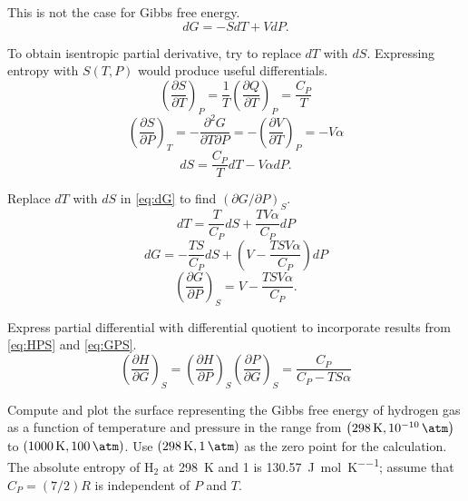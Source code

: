 \begin{@empty}
\begin{answer}
    This is not the case for Gibbs free energy.
    \begin{equation}
        dG = -SdT + VdP. \label{eq:dG}
    \end{equation}

    To obtain isentropic partial derivative, try to replace $dT$ with $dS$.
    Expressing entropy with $S(T, P)$ would produce useful differentials.
    \[
        \left( \frac{\partial S}{\partial T} \right)_P
        = \frac1T \left( \frac{\partial Q}{\partial T} \right)_P
        = \frac{C_P}{T}
    \]
    \[
        \left( \frac{\partial S}{\partial P} \right)_T
        = -\frac{\partial^2 G}{\partial T \partial P}
        = -\left( \frac{\partial V}{\partial T} \right)_P
        = -V \alpha
    \]
    \[ dS = \frac{C_P}{T} dT - V \alpha dP. \]

    Replace $dT$ with $dS$ in \eqref{eq:dG} to find
    $\left( \partial G / \partial P \right)_S$.
    \[ dT = \frac{T}{C_P} dS + \frac{TV\alpha}{C_P} dP \]
    \[ dG = -\frac{TS}{C_P} dS + \left( V - \frac{TSV\alpha}{C_P} \right) dP \]
    \begin{equation}
        \left( \frac{\partial G}{\partial P} \right)_S = V - \frac{TSV\alpha}{C_P}. \label{eq:GPS}
    \end{equation}

    Express partial differential with differential quotient to incorporate
    results from \eqref{eq:HPS} and \eqref{eq:GPS}.
    \[
        \left( \frac{\partial H}{\partial G} \right)_S
        = \left( \frac{\partial H}{\partial P} \right)_S \left( \frac{\partial P}{\partial G} \right)_S
        = \frac{C_P}{C_P - TS\alpha}
    \]
\end{answer}

\begin{problem}
\end{problem}

\begin{problem}
\end{problem}

\begin{problem}
\end{problem}

\begin{problem}
\end{problem}

\begin{problem}
    Compute and plot the surface representing the Gibbs free energy of hydrogen
    gas as a function of temperature and pressure in the range from $\left(
    \SI{298}{\kelvin}, \SI{e-10}{\atm} \right)$ to $\left( \SI{1000}{\kelvin},
    \SI{100}{\atm} \right)$.  Use $\left( \SI{298}{\kelvin}, \SI{1}{\atm}
    \right)$ as the zero point for the calculation.  The absolute entropy of
    H$_2$ at \SI{298}{\kelvin} and \SI{1}{\atm} is
    \SI{130.57}{\joule\per\mol\per\kelvin}; assume that $C_P = (7/2) R$ is
    independent of $P$ and $T$.
\end{problem}


\end{@empty}
